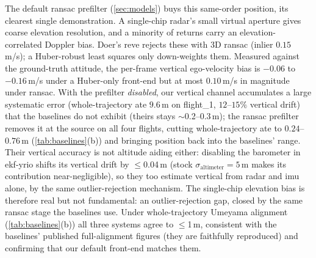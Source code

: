 The default \ac{ransac} prefilter (\autoref{sec:models}) buys this
same-order position, its clearest single demonstration.
A single-chip radar's small virtual aperture gives coarse
elevation resolution, and a minority of returns carry an
elevation-correlated Doppler bias.  Doer's \mbox{reve} rejects these
with 3D \ac{ransac} (inlier $0.15$\,m/s); a Huber-robust least squares only
down-weights them.  Measured against the ground-truth attitude, the
per-frame vertical ego-velocity bias is $-0.06$ to $-0.16$\,m/s under a
Huber-only front-end but at most $0.10$\,m/s in magnitude under \ac{ransac}.
With the prefilter \emph{disabled}, our vertical channel accumulates a
large systematic error (whole-trajectory \ac{ate} $9.6$\,m on flight\_1,
$12$--$15\%$ vertical drift) that the baselines do not exhibit (theirs
stays $\sim$0.2--0.3\,m); the \ac{ransac} prefilter removes it
at the source on all four flights, cutting whole-trajectory \ac{ate} to
$0.24$--$0.76$\,m (\autoref{tab:baselines}(b)) and bringing
position back into the baselines' range.  Their vertical accuracy is
not altitude aiding either: disabling the barometer in ekf-yrio shifts
its vertical drift by $\le$0.04\,m (stock $\sigma_\mathrm{altimeter}{=}5$\,m
makes its contribution near-negligible), so they too estimate vertical from radar and
\ac{imu} alone, by the same outlier-rejection mechanism.  The single-chip
elevation bias is therefore real but not fundamental: an
outlier-rejection gap, closed by the same \ac{ransac} stage the
baselines use.  Under
whole-trajectory Umeyama alignment (\autoref{tab:baselines}(b))
all three systems agree to $\le$1\,m, consistent with the baselines'
published full-alignment figures (they are faithfully reproduced) and
confirming that our default front-end matches them.

